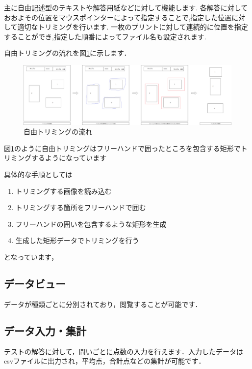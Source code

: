 \documentclass[12pt]{jsreport}
\begin{document}
    主に自由記述型のテキストや解答用紙などに対して機能します.
    各解答に対しておおよその位置をマウスポインターによって指定することで,指定した位置に対して適切なトリミングを行います.
    一枚のプリントに対して連続的に位置を指定することができ,指定した順番によってファイル名も設定されます.

    自由トリミングの流れを図\ref{fig:FreeTrimFlow}に示します．

    \begin{figure}[htbp]
        \centering
        \begin{minipage}{1\hsize}
            \begin{center}
                \includegraphics[width=150mm]{FreeTrimFlow.png}
            \end{center}
            \caption{自由トリミングの流れ}
            \label{fig:FreeTrimFlow}
        \end{minipage}
    \end{figure}

    図\ref{fig:FreeTrimFlow}のように自由トリミングはフリーハンドで囲ったところを包含する矩形でトリミングするようになっています


    具体的な手順としては
    \begin{enumerate}
        \item トリミングする画像を読み込む
        \item トリミングする箇所をフリーハンドで囲む
        \item フリーハンドの囲いを包含するような矩形を生成
        \item 生成した矩形データでトリミングを行う
    \end{enumerate}

    となっています，

\subsection{データビュー}
データが種類ごとに分別されており，閲覧することが可能です．
\subsection{データ入力・集計}
テストの解答に対して，問いごとに点数の入力を行えます．入力したデータはcsvファイルに出力され，平均点，合計点などの集計が可能です．
\end{document}
